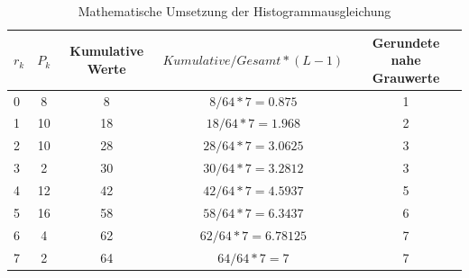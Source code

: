   \begin{table}
  [h]
  \caption{Mathematische Umsetzung der Histogrammausgleichung}
  \centering
  \begin{tabular}{|l|c|c|c|c|}
  \hline
  $r_{k}$ & $P_{k}$ & Kumulative Werte & $Kumulative/Gesamt*(L-1)$ & Gerundete nahe Grauwerte\\
  \hline
  0 & 8 & 8 & $8/64*7=0.875$ & 1\\
  \hline
  1 & 10 & 18 & $18/64*7=1.968$ & 2\\
  \hline
  2 & 10 & 28 & $28/64*7=3.0625$ & 3\\
  \hline
  3 & 2 & 30 & $30/64*7=3.2812$ & 3\\
  \hline
  4 & 12 & 42 & $42/64*7=4.5937$ & 5\\
  \hline
  5 & 16 & 58 & $58/64*7=6.3437$ & 6\\
  \hline
  6 & 4 & 62 & $62/64*7=6.78125$ & 7\\
  \hline
  7 & 2 & 64 & $64/64*7=7$ & 7\\
  \hline
  \end{tabular}
  \end{table}
